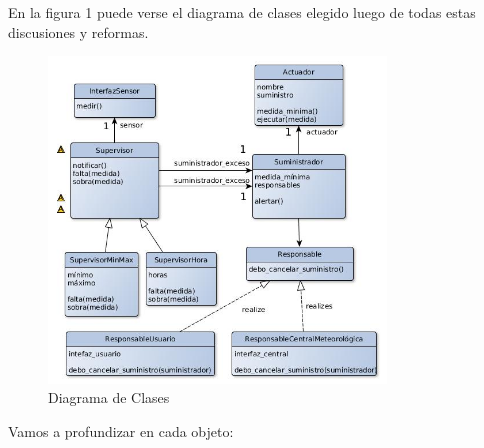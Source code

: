  
En la figura 1 puede verse el diagrama de clases elegido luego de todas estas discusiones y reformas.

\begin{figure}[h!]
  \centering
  \includegraphics[width=0.8\textwidth]{./imagenes/clases2.jpg}
  \caption{Diagrama de Clases}
  \label{fig:sec_sum1}
\end{figure}


\newpage Vamos a profundizar en cada objeto:

